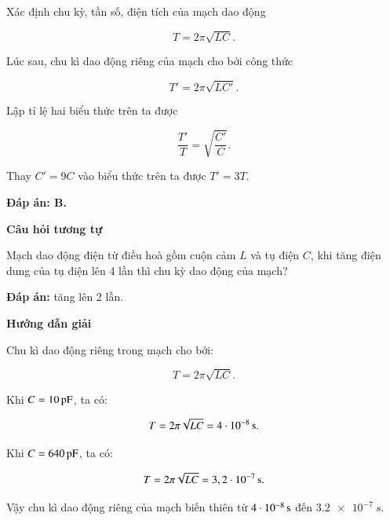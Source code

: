 \begin{dang}{Xác định chu kỳ, tần số, điện tích của mạch dao động}
{		$$T = 2\pi \sqrt{LC}.$$
		
		Lúc sau, chu kì dao động riêng của mạch cho bởi công thức 
		
		$$T' = 2\pi \sqrt{LC'}.$$ 
		
		Lập tỉ lệ hai biểu thức trên ta được
		
		$$\dfrac{T'}{T} = \sqrt{\dfrac{C'}{C}}.$$
		
		Thay $C' = 9C$ vào biểu thức trên ta được $T' = 3T$.
		
		\textbf{Đáp án: B.}
		
		\begin{center}
			\textbf{Câu hỏi tương tự}
		\end{center}
		
		Mạch dao động điện từ điều hoà gồm cuộn cảm $L$ và tụ điện $C$, khi tăng điện dung của tụ điện lên 4 lần thì chu kỳ dao động của mạch?
		
		\textbf{Đáp án:} tăng lên 2 lần.
	}
	
	
	{	\begin{center}
			\textbf{Hướng dẫn giải}
		\end{center}
		
		Chu kì dao động riêng trong mạch cho bởi: 
		
		$$T = 2\pi \sqrt{LC}.$$
		
		Khi $C = \xsi{10}{pF}$, ta có:
		
		$$T = 2\pi \sqrt{LC} = \xsi{4\cdot10^{-8}}{s}.$$ 
		
		Khi $C = \xsi{640}{pF}$, ta có:
		
		$$T = 2\pi \sqrt{LC} = \xsi{3,2\cdot10^{-7}}{s}.$$ 
		
		Vậy chu kì dao động riêng của mạch biến thiên từ $\xsi{4\cdot10^{-8}}{s}$ đến $\SI{3,2 e-7}{s}$.
		
}
\end{dang}
